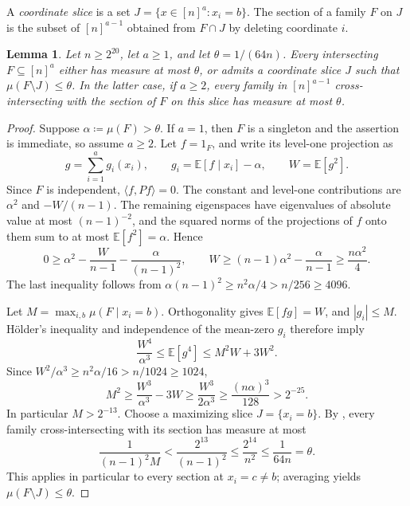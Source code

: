 \documentclass[10pt]{article}
\numberwithin{equation}{section}
\newtheorem{lemma}[lemma]{Lemma}\aliascntresetthe{lemma}
\theoremstyle{definition}
\begin{document}
A \emph{coordinate slice} is a set $J=\{x\in[n]^a\colon x_i=b\}$. The section of a family $F$ on $J$ is the subset of $[n]^{a-1}$ obtained from $F\cap J$ by deleting coordinate $i$.

\begin{lemma}
\label{lem:spectral-fourth}\label{cor:spectral-slice}
Let $n\ge2^{20}$, let $a\ge1$, and let $\theta=1/(64n)$. Every intersecting $F\subseteq[n]^a$ either has measure at most $\theta$, or admits a coordinate slice $J$ such that $\mu(F\setminus J)\le\theta$. In the latter case, if $a\ge2$, every family in $[n]^{a-1}$ cross-intersecting with the section of $F$ on this slice has measure at most $\theta$.
\end{lemma}
\begin{proof}
Suppose $\alpha\coloneqq\mu(F)>\theta$. If $a=1$, then $F$ is a singleton and the assertion is immediate, so assume $a\ge2$. Let $f=1_F$, and write its level-one projection as
\[
 g=\sum_{i=1}^a g_i(x_i),\qquad
 g_i=\mathbb E[f\mid x_i]-\alpha,\qquad W=\mathbb E[g^2].
\]
Since $F$ is independent, $\langle f,Pf\rangle=0$. The constant and level-one contributions are $\alpha^2$ and $-W/(n-1)$. The remaining eigenspaces have eigenvalues of absolute value at most $(n-1)^{-2}$, and the squared norms of the projections of $f$ onto them sum to at most $\mathbb E[f^2]=\alpha$. Hence
\[
 0\ge\alpha^2-\frac{W}{n-1}-\frac{\alpha}{(n-1)^2},
 \qquad
 W\ge(n-1)\alpha^2-\frac{\alpha}{n-1}
   \ge\frac{n\alpha^2}{4}.
\]
The last inequality follows from $\alpha(n-1)^2\ge n^2\alpha/4>n/256\ge4096$.

Let $M=\max_{i,b}\mu(F\mid x_i=b)$. Orthogonality gives $\mathbb E[fg]=W$, and $|g_i|\le M$. H\"older's inequality and independence of the mean-zero $g_i$ therefore imply
\[
 \frac{W^4}{\alpha^3}\le\mathbb E[g^4]
 \le M^2W+3W^2.
\]
Since $W^2/\alpha^3\ge n^2\alpha/16>n/1024\ge1024$,
\[
 M^2\ge\frac{W^3}{\alpha^3}-3W
 \ge\frac{W^3}{2\alpha^3}
 \ge\frac{(n\alpha)^3}{128}>2^{-25}.
\]
In particular $M>2^{-13}$. Choose a maximizing slice $J=\{x_i=b\}$. By , every family cross-intersecting with its section has measure at most
\[
 \frac1{(n-1)^2M}
 <\frac{2^{13}}{(n-1)^2}
 \le\frac{2^{14}}{n^2}
 \le\frac1{64n}=\theta.
\]
This applies in particular to every section at $x_i=c\ne b$; averaging yields $\mu(F\setminus J)\le\theta$.
\end{proof}
\end{document}
